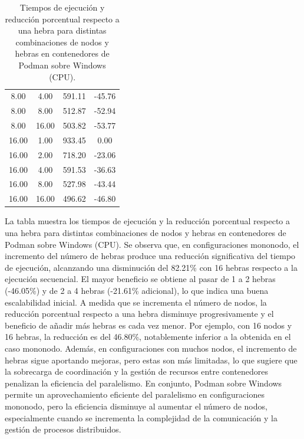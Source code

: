 \begin{table}[ht]
\begin{tabular}{|c|c|c|c|}
        8.00           & 4.00            & 591.11              & -45.76                         \\
        8.00           & 8.00            & 512.87              & -52.94                         \\
        8.00           & 16.00           & 503.82              & -53.77                         \\
        16.00          & 1.00            & 933.45              & 0.00                           \\
        16.00          & 2.00            & 718.20              & -23.06                         \\
        16.00          & 4.00            & 591.53              & -36.63                         \\
        16.00          & 8.00            & 527.98              & -43.44                         \\
        16.00          & 16.00           & 496.62              & -46.80                         \\
        \hline
    \end{tabular}
    \caption{Tiempos de ejecución y reducción porcentual respecto a una hebra para distintas combinaciones de nodos y hebras en contenedores de Podman sobre Windows (CPU).}
    \label{tab:thread_sweep_windows_podman_time}
\end{table}

La tabla muestra los tiempos de ejecución y la reducción porcentual respecto a una hebra para distintas combinaciones de nodos y hebras en contenedores de Podman sobre Windows (CPU). Se observa que, en configuraciones mononodo, el incremento del número de hebras produce una reducción significativa del tiempo de ejecución, alcanzando una disminución del 82.21\% con 16 hebras respecto a la ejecución secuencial. El mayor beneficio se obtiene al pasar de 1 a 2 hebras (-46.05\%) y de 2 a 4 hebras (-21.61\% adicional), lo que indica una buena escalabilidad inicial. A medida que se incrementa el número de nodos, la reducción porcentual respecto a una hebra disminuye progresivamente y el beneficio de añadir más hebras es cada vez menor. Por ejemplo, con 16 nodos y 16 hebras, la reducción es del 46.80\%, notablemente inferior a la obtenida en el caso mononodo. Además, en configuraciones con muchos nodos, el incremento de hebras sigue aportando mejoras, pero estas son más limitadas, lo que sugiere que la sobrecarga de coordinación y la gestión de recursos entre contenedores penalizan la eficiencia del paralelismo. En conjunto, Podman sobre Windows permite un aprovechamiento eficiente del paralelismo en configuraciones mononodo, pero la eficiencia disminuye al aumentar el número de nodos, especialmente cuando se incrementa la complejidad de la comunicación y la gestión de procesos distribuidos.


